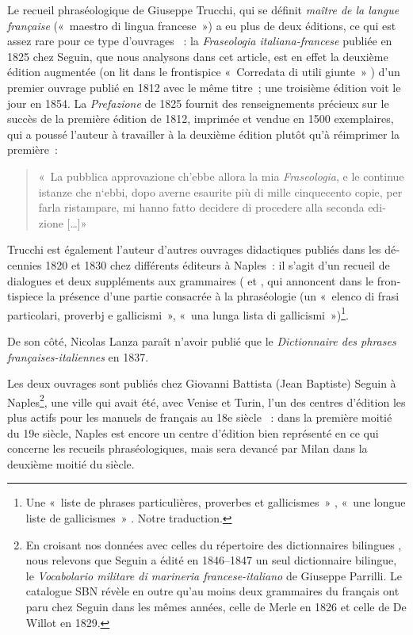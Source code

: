 \documentclass[output=paper,booklanguage=french]{langscibook}
\begin{document}
\begin{otherlanguage}{french}
Le recueil phraséologique de Giuseppe Trucchi, qui se définit \emph{maître de la langue française} («~maestro di lingua francese~») a eu plus de deux éditions, ce qui est assez rare pour ce type d’ouvrages \citep[171]{Murano2017}~: la \emph{Fraseologia italiana-francese} publiée en 1825 chez Seguin, que nous analysons dans cet article, est en effet la deuxième édition augmentée (on lit dans le frontispice «~Corredata di utili giunte~» ) d’un premier ouvrage publié en 1812 avec le même titre~; une troisième édition voit le jour en 1854. La \emph{Prefazione} de 1825 fournit des renseignements précieux sur le succès de la première édition de 1812, imprimée et vendue en 1500 exemplaires, qui a poussé l’auteur à travailler à la deuxième édition plutôt qu’à réimprimer la première~:

\begin{quote}
    «~La pubblica approvazione ch’ebbe allora la mia \emph{Fraseologia}, e le continue istanze che n‘ebbi, dopo averne esaurite più di mille cinquecento copie, per farla ristampare, mi hanno fatto decidere di procedere alla seconda edizione […]»
\end{quote}

Trucchi est également l’auteur d’autres ouvrages didactiques publiés dans les décennies 1820 et 1830 chez différents éditeurs à Naples~: il s’agit d’un recueil de dialogues \citep{Trucchi1834} et deux suppléments aux grammaires (\citep{Trucchi1831}  et \citep{Trucchi1837}, qui annoncent dans le frontispiece la présence d’une partie consacrée à la phraséologie (un «~elenco di frasi particolari, proverbj e gallicismi~», «~una lunga lista di gallicismi~»)\footnote{Une «~liste de phrases particulières, proverbes et gallicismes~» \citep{Trucchi1834}, «~une longue liste de gallicismes~» \citep{Trucchi1825}. Notre traduction.}.

De son côté, Nicolas Lanza paraît n’avoir publié que le \emph{Dictionnaire des phrases françaises-italiennes} en 1837. 

Les deux ouvrages sont publiés chez Giovanni Battista (Jean Baptiste) Seguin à Naples\footnote{En croisant nos données avec celles du répertoire des dictionnaires bilingues \citep{Lillo2019}, nous relevons que Seguin a édité en 1846--1847 un seul dictionnaire bilingue, le \emph{Vocabolario militare di marineria francese-italiano} de Giuseppe Parrilli. Le catalogue SBN révèle en outre qu’au moins deux grammaires du français ont paru chez Seguin dans les mêmes années, celle de Merle en 1826 et celle de De Willot en 1829.}, une ville qui avait été, avec Venise et Turin, l’un des centres d’édition les plus actifs pour les manuels de français au 18e siècle \citep[102]{Minerva1996}~: dans la première moitié du 19e siècle, Naples est encore un centre d’édition bien représenté en ce qui concerne les recueils phraséologiques, mais sera devancé par Milan dans la deuxième moitié du siècle.


\end{otherlanguage}
\end{document}
